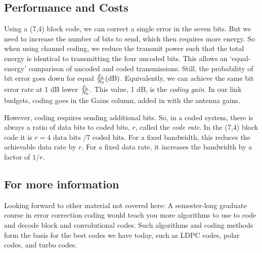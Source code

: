 \subsection{Performance and Costs}

Using a (7,4) block code, we can correct a single error in the seven bits.  But we need to increase the number of bits to send, which then requires more energy.  So when using channel coding, we reduce the transmit power such that the total energy is identical to transmitting the four uncoded bits.  This allows an `equal-energy' comparison of uncoded and coded transmissions.  Still, the probability of bit error goes down for equal $\frac{\mathcal{E}_b}{N_0} (\mbox{dB})$.  Equivalently, we can achieve the same bit error rate at 1 dB lower $\frac{\mathcal{E}_b}{N_0}$.  This value, 1 dB, is the \textit{coding gain}.  In our link budgets, coding goes in the Gains column, added in with the antenna gains.

However, coding requires sending additional bits.  So, in a coded system, there is always a ratio of data bits to coded bits, $r$, called the \textit{code rate}.  In the (7,4) block code it is $r = 4 \mbox{ data bits } / 7 \mbox{ coded bits}$.  For a fixed bandwidth, this reduces the achievable data rate by $r$.  For a fixed data rate, it increases the bandwidth by a factor of $1/r$.

\subsection{For more information}

Looking forward to other material not covered here: A semester-long graduate course in error correction coding would teach you more algorithms to use to code and decode block and convolutional codes.  Such algorithms and coding methods form the basis for the best codes we have today, such as LDPC codes, polar codes, and turbo codes. 